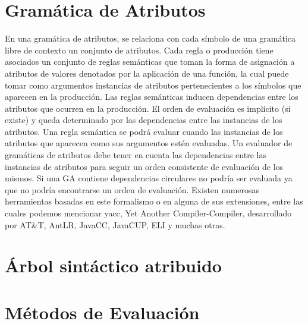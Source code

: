 \section{Gramática de Atributos}

En una gramática de atributos, se relaciona con cada símbolo de una gramática libre de contexto un conjunto de atributos. Cada regla o producción tiene asociados un conjunto de reglas semánticas que toman la forma de asignación a atributos de valores denotados por la aplicación de una función, la cual puede tomar como argumentos instancias de atributos pertenecientes a los símbolos que aparecen en la producción.
Las reglas semánticas inducen dependencias entre los atributos que ocurren en la producción. El orden de evaluación es implícito (si existe) y queda determinado por las dependencias entre las instancias de los atributos.
Una regla semántica se podrá evaluar cuando las instancias de los atributos que aparecen como sus argumentos estén evaluadas. Un evaluador de gramáticas de atributos debe tener en cuenta las dependencias entre las instancias de atributos para seguir un orden consistente de evaluación de los mismos.
Si una GA contiene dependencias circulares no podría ser evaluada ya que no podría encontrarse un orden de evaluación. Existen numerosas herramientas basadas en este formalismo o en alguna de sus extensiones, entre las cuales podemos mencionar yacc, Yet Another Compiler-Compiler, desarrollado por AT\&T, AntLR, JavaCC, JavaCUP, ELI y muchas otras.


\section{Árbol sintáctico atribuido}


\section{Métodos de Evaluación}

